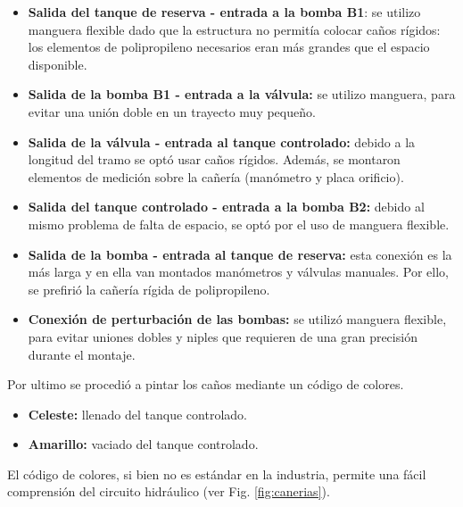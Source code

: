 \begin{itemize}
  \item \textbf{Salida del tanque de reserva - entrada a la bomba B1}:
  se utilizo manguera flexible dado que la estructura no permitía colocar caños
  rígidos: los elementos de polipropileno necesarios eran más grandes que el
  espacio disponible.

  \item \textbf{Salida de la bomba B1 - entrada a la válvula:}
  se utilizo manguera, para evitar una unión doble en un trayecto muy pequeño.
  
  \item \textbf{Salida de la válvula - entrada al tanque controlado:}
  debido a la longitud del tramo se optó usar caños rígidos.
  Además, se montaron elementos de medición sobre la cañería (manómetro y
  placa orificio).
  
  \item \textbf{Salida del tanque controlado - entrada a la bomba B2:}
  debido al mismo problema de falta de espacio, se optó por el uso de manguera
  flexible.
  
  \item \textbf{Salida de la bomba - entrada al tanque de reserva:}
  esta conexión es la más larga y en ella van montados manómetros y
  válvulas manuales. Por ello, se prefirió la cañería rígida de polipropileno.

  \item \textbf{Conexión de perturbación de las bombas:}
  se utilizó manguera flexible, para evitar uniones dobles y
  niples que requieren de una gran precisión durante el montaje.
 \end{itemize}

Por ultimo se procedió a pintar los caños mediante un código de colores.
 \begin{itemize}
  \item {\color{Cerulean} \textbf{Celeste:}} llenado del tanque controlado.
  \item {\color{YellowOrange} \textbf{Amarillo:}} vaciado del tanque controlado.
 \end{itemize}
El código de colores, si bien no es estándar en la industria, permite una fácil
comprensión del circuito hidráulico (ver Fig. \ref{fig:canerias}).

